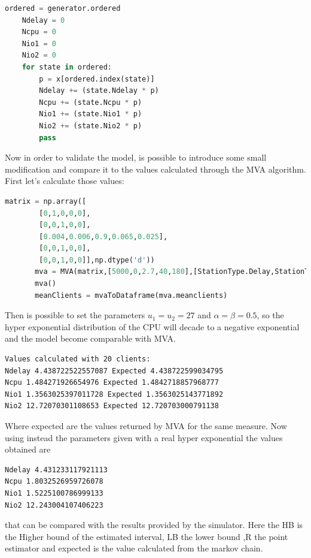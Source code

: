 \documentclass[12pt,a4paper]{article}
\begin{document}
\begin{lstlisting}[language=python]
    ordered = generator.ordered
    Ndelay = 0
    Ncpu = 0
    Nio1 = 0
    Nio2 = 0
    for state in ordered:
        p = x[ordered.index(state)]
        Ndelay += (state.Ndelay * p)
        Ncpu += (state.Ncpu * p)
        Nio1 += (state.Nio1 * p)
        Nio2 += (state.Nio2 * p)
        pass
\end{lstlisting}

Now in order to validate the model, is possible to introduce some small modification and compare it to the values calculated through the MVA algorithm. First let's calculate those values:
\begin{lstlisting}[language=python]
    matrix = np.array([
        [0,1,0,0,0],
        [0,0,1,0,0],
        [0.004,0.006,0.9,0.065,0.025],
        [0,0,1,0,0],
        [0,0,1,0,0]],np.dtype('d'))
       mva = MVA(matrix,[5000,0,2.7,40,180],[StationType.Delay,StationType.LoadIndependent,StationType.LoadIndependent,StationType.LoadIndependent,StationType.LoadIndependent],30)
       mva()
       meanClients = mvaToDataframe(mva.meanclients)
\end{lstlisting}
\pagebreak
Then is possible to set the parameters $u_1=u_2=27$ and $\alpha=\beta=0.5$, so the hyper exponential distribution of the CPU will decade to a negative exponential and the model become comparable with MVA. 

\begin{verbatim}
Values calculated with 20 clients:
Ndelay 4.438722522557087 Expected 4.438722599034795
Ncpu 1.484271926654976 Expected 1.4842718857968777
Nio1 1.3563025397011728 Expected 1.3563025143771892
Nio2 12.72070301108653 Expected 12.720703000791138
\end{verbatim}

Where expected are the values returned by MVA for the same measure. Now using instead the parameters given with a real hyper exponential the values obtained are 

\begin{verbatim}
Ndelay 4.431233117921113
Ncpu 1.8032526959726078 
Nio1 1.5225100786999133 
Nio2 12.243004107406223 
\end{verbatim}

that can be compared with the results provided by the simulator. Here the HB is the Higher bound of the estimated interval, LB the lower bound ,R the point estimator and expected is the value calculated from the markov chain.
\end{document}
